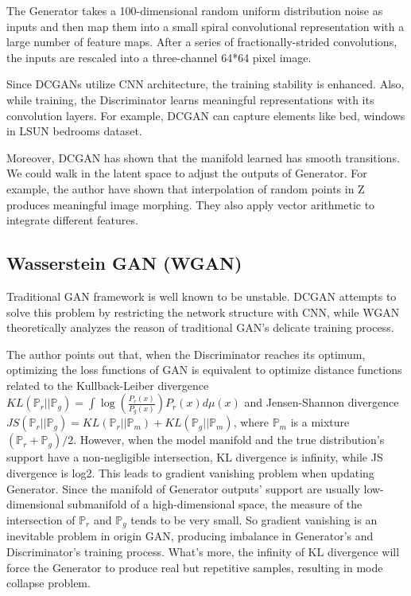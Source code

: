 The Generator takes a 100-dimensional random uniform distribution noise as inputs and then map them into a small spiral convolutional representation with a large number of feature maps. After a series of fractionally-strided convolutions, the inputs are rescaled into a three-channel 64*64 pixel image. 

Since DCGANs utilize CNN architecture, the training stability is enhanced. Also, while training, the Discriminator learns meaningful representations with its convolution layers. For example, DCGAN can capture elements like bed, windows in LSUN bedrooms dataset. 

Moreover, DCGAN has shown that the manifold learned has smooth transitions. We could walk in the latent space to adjust the outputs of Generator. For example, the author have shown that interpolation of random points in Z produces meaningful image morphing. They also apply vector arithmetic to integrate different features.


\subsection{Wasserstein GAN (WGAN)\cite{arjovsky2017wasserstein}}
Traditional GAN framework is well known to be unstable. DCGAN attempts to solve this problem by restricting the network structure with CNN, while WGAN theoretically analyzes the reason of traditional GAN's delicate training process.

The author points out that, when the Discriminator reaches its optimum, optimizing the loss functions of GAN is equivalent to optimize distance functions related to the Kullback-Leiber divergence $KL(\mathbb{P}_r||\mathbb{P}_g) = \int \log(\frac{P_r(x)}{P_g(x)})P_r(x)d\mu(x)$ and Jensen-Shannon divergence $JS(\mathbb{P}_r||\mathbb{P}_g)=KL(\mathbb{P}_r||\mathbb{P}_m)+KL(\mathbb{P}_g||\mathbb{P}_m)$, where $\mathbb{P}_m$ is a mixture $(\mathbb{P}_r+\mathbb{P}_g)/2$. However, when the model manifold and the true distribution's support have a non-negligible intersection, KL divergence is infinity, while JS divergence is log2. This leads to gradient vanishing problem when updating Generator. Since the manifold of Generator outputs' support are usually low-dimensional submanifold of a high-dimensional space, the measure of the intersection of $\mathbb{P}_r$ and $\mathbb{P}_g$ tends to be very small. So gradient vanishing is an inevitable problem in origin GAN, producing imbalance in Generator's and Discriminator's training process. What's more, the infinity of KL divergence will force the Generator to produce real but repetitive samples, resulting in mode collapse problem.

